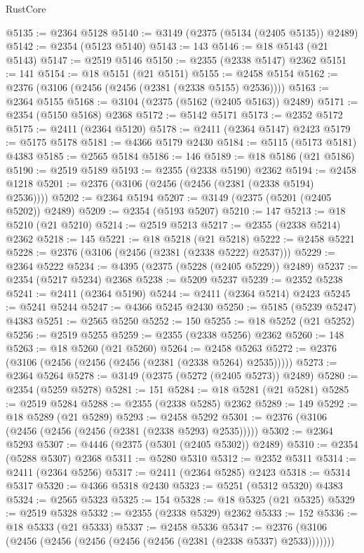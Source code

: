 \begin{lexlean}{RustCore}
\begin{coremodule}
@5135 := @2364 @5128
@5140 := @3149 (@2375 (@5134 (@2405 @5135)) @2489)
@5142 := @2354 (@5123 @5140)
@5143 := 143
@5146 := @18 @5143 (@21 @5143)
@5147 := @2519 @5146
@5150 := @2355 (@2338 @5147) @2362
@5151 := 141
@5154 := @18 @5151 (@21 @5151)
@5155 := @2458 @5154
@5162 := @2376 (@3106 (@2456 (@2456 (@2381 (@2338 @5155) @2536))))
@5163 := @2364 @5155
@5168 := @3104 (@2375 (@5162 (@2405 @5163)) @2489)
@5171 := @2354 (@5150 @5168) @2368
@5172 := @5142 @5171
@5173 := @2352 @5172
@5175 := @2411 (@2364 @5120)
@5178 := @2411 (@2364 @5147) @2423
@5179 := @5175 @5178
@5181 := @4366 @5179 @2430
@5184 := @5115 (@5173 @5181) @4383
@5185 := @2565 @5184
@5186 := 146
@5189 := @18 @5186 (@21 @5186)
@5190 := @2519 @5189
@5193 := @2355 (@2338 @5190) @2362
@5194 := @2458 @1218
@5201 := @2376 (@3106 (@2456 (@2456 (@2381 (@2338 @5194) @2536))))
@5202 := @2364 @5194
@5207 := @3149 (@2375 (@5201 (@2405 @5202)) @2489)
@5209 := @2354 (@5193 @5207)
@5210 := 147
@5213 := @18 @5210 (@21 @5210)
@5214 := @2519 @5213
@5217 := @2355 (@2338 @5214) @2362
@5218 := 145
@5221 := @18 @5218 (@21 @5218)
@5222 := @2458 @5221
@5228 := @2376 (@3106 (@2456 (@2381 (@2338 @5222) @2537)))
@5229 := @2364 @5222
@5234 := @4395 (@2375 (@5228 (@2405 @5229)) @2489)
@5237 := @2354 (@5217 @5234) @2368
@5238 := @5209 @5237
@5239 := @2352 @5238
@5241 := @2411 (@2364 @5190)
@5244 := @2411 (@2364 @5214) @2423
@5245 := @5241 @5244
@5247 := @4366 @5245 @2430
@5250 := @5185 (@5239 @5247) @4383
@5251 := @2565 @5250
@5252 := 150
@5255 := @18 @5252 (@21 @5252)
@5256 := @2519 @5255
@5259 := @2355 (@2338 @5256) @2362
@5260 := 148
@5263 := @18 @5260 (@21 @5260)
@5264 := @2458 @5263
@5272 := @2376 (@3106 (@2456 (@2456 (@2456 (@2381 (@2338 @5264) @2535)))))
@5273 := @2364 @5264
@5278 := @3149 (@2375 (@5272 (@2405 @5273)) @2489)
@5280 := @2354 (@5259 @5278)
@5281 := 151
@5284 := @18 @5281 (@21 @5281)
@5285 := @2519 @5284
@5288 := @2355 (@2338 @5285) @2362
@5289 := 149
@5292 := @18 @5289 (@21 @5289)
@5293 := @2458 @5292
@5301 := @2376 (@3106 (@2456 (@2456 (@2456 (@2381 (@2338 @5293) @2535)))))
@5302 := @2364 @5293
@5307 := @4446 (@2375 (@5301 (@2405 @5302)) @2489)
@5310 := @2354 (@5288 @5307) @2368
@5311 := @5280 @5310
@5312 := @2352 @5311
@5314 := @2411 (@2364 @5256)
@5317 := @2411 (@2364 @5285) @2423
@5318 := @5314 @5317
@5320 := @4366 @5318 @2430
@5323 := @5251 (@5312 @5320) @4383
@5324 := @2565 @5323
@5325 := 154
@5328 := @18 @5325 (@21 @5325)
@5329 := @2519 @5328
@5332 := @2355 (@2338 @5329) @2362
@5333 := 152
@5336 := @18 @5333 (@21 @5333)
@5337 := @2458 @5336
@5347 := @2376 (@3106 (@2456 (@2456 (@2456 (@2456 (@2456 (@2381 (@2338 @5337) @2533)))))))

\end{coremodule}
\end{lexlean}
